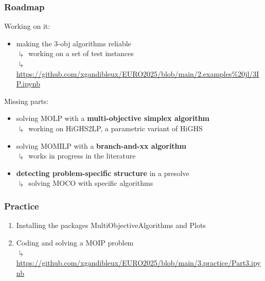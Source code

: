 \documentclass[]{beamer}
\begin{document}
\begin{frame}
  \frametitle{Roadmap}
\vspace{3mm}

Working on it:

\begin{itemize}
\item making the 3-obj algorithms reliable\\
$\drsh$ working on a set of test instances\\
$\drsh$ {\tiny \url{https://github.com/xgandibleux/EURO2025/blob/main/2.examples\%20jl/3IP.ipynb}}
\end{itemize}
\bigskip
\pause

Missing parts:

\begin{itemize}
\item solving MOLP with a  \textbf{multi-objective simplex algorithm}\\
$\drsh$ working on HiGHS2LP, a parametric variant of HiGHS
\smallskip
\item solving MOMILP with a  \textbf{branch-and-xx algorithm}\\
$\drsh$ works in progress in the literature 
\smallskip
\item \textbf{detecting problem-specific structure} in a presolve\\
$\drsh$ solving MOCO with specific algorithms 
\end{itemize}


\end{frame}




% 
%

\begin{frame}
  \frametitle{Practice}
\vspace{3mm}

\begin{enumerate}
\item Installing the packages MultiObjectiveAlgorithms and Plots

\item Coding and solving a MOIP problem \\
$\drsh$ \tiny{\url{https://github.com/xgandibleux/EURO2025/blob/main/3.practice/Part3.ipynb}}
\vspace{3mm}

\end{enumerate}
\end{frame}
\end{document}
